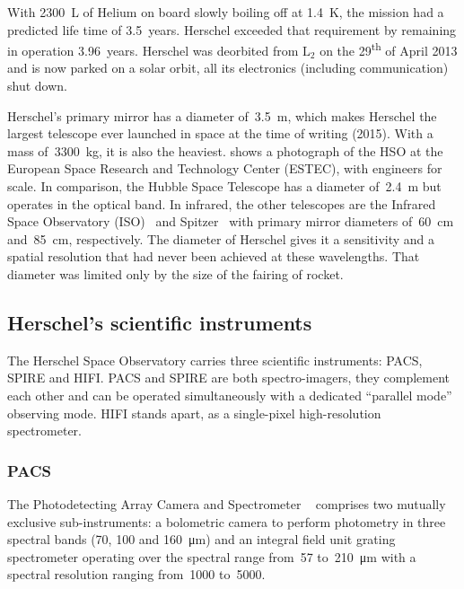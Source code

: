 With \SI{2300}{\liter} of Helium on board slowly boiling off at \SI{1.4}{\kelvin}, the mission had a predicted life time of 3.5~years.
Herschel exceeded that requirement by remaining in operation 3.96~years.
Herschel was deorbited from $\text{L}_2$ on the 29\textsuperscript{th} of April 2013 and is now parked on a solar orbit, all its electronics (including communication) shut down.



Herschel's primary mirror has a diameter of~\SI{3.5}{\meter}, which makes Herschel the largest telescope ever launched in space at the time of writing (2015).
With a mass of~\SI{3300}{\kilo\gram}, it is also the heaviest.
 shows a photograph of the HSO at the European Space Research and Technology Center (ESTEC), with engineers for scale.
In comparison, the Hubble Space Telescope has a diameter of~\SI{2.4}{\meter} but operates in the optical band.
In infrared, the other telescopes
are
the Infrared Space Observatory (ISO)~\parencite{isoHandbook1}
and
Spitzer~\parencite{werner2004spitzer}
with primary mirror diameters of~\SI{60}{\centi\meter} and~\SI{85}{\centi\meter}, respectively.
The diameter of Herschel gives it a sensitivity and a spatial resolution that had never been achieved at these wavelengths.
That diameter was limited only by the size of the fairing of rocket.


\subsection{Herschel's scientific instruments}

The Herschel Space Observatory carries three scientific instruments: PACS, SPIRE and HIFI.
PACS and SPIRE are both  spectro-imagers, they complement each other and can be operated simultaneously with a dedicated ``parallel mode'' observing mode.
HIFI stands apart, as a single-pixel high-resolution spectrometer.

\subsubsection{PACS}
The Photodetecting Array Camera and Spectrometer%
~\parencite{poglitsch2010photodetector}
comprises two mutually exclusive sub-instruments: a bolometric camera to perform photometry in three spectral bands (\num{70}, \num{100} and \SI{160}{\micro\meter}) and an integral field unit grating spectrometer operating over the spectral range from~\num{57} to~\SI{210}{\micro\meter} with a spectral resolution ranging from~\num{1000} to~\num{5000}.

